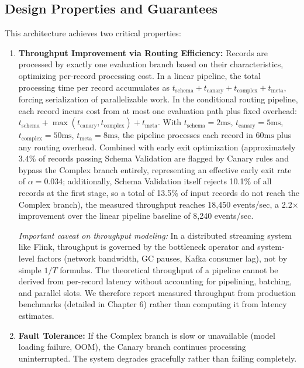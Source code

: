\subsection{Design Properties and Guarantees}

This architecture achieves two critical properties:

\begin{enumerate}
    \item \textbf{Throughput Improvement via Routing Efficiency:} Records are processed by exactly one evaluation branch based on their characteristics, optimizing per-record processing cost. In a linear pipeline, the total processing time per record accumulates as $t_{\text{schema}} + t_{\text{canary}} + t_{\text{complex}} + t_{\text{meta}}$, forcing serialization of parallelizable work. In the conditional routing pipeline, each record incurs cost from at most one evaluation path plus fixed overhead: $t_{\text{schema}} + \max(t_{\text{canary}}, t_{\text{complex}}) + t_{\text{meta}}$. With $t_{\text{schema}} = 2\text{ms}$, $t_{\text{canary}} = 5\text{ms}$, $t_{\text{complex}} = 50\text{ms}$, $t_{\text{meta}} = 8\text{ms}$, the pipeline processes each record in $60\text{ms}$ plus any routing overhead. Combined with early exit optimization (approximately 3.4\% of records passing Schema Validation are flagged by Canary rules and bypass the Complex branch entirely, representing an effective early exit rate of $\alpha = 0.034$; additionally, Schema Validation itself rejects 10.1\% of all records at the first stage, so a total of 13.5\% of input records do not reach the Complex branch), the measured throughput reaches 18,450 events/sec, a 2.2$\times$ improvement over the linear pipeline baseline of 8,240 events/sec.

        \textit{Important caveat on throughput modeling:} In a distributed streaming system like Flink, throughput is governed by the bottleneck operator and system-level factors (network bandwidth, GC pauses, Kafka consumer lag), not by simple $1/T$ formulas. The theoretical throughput of a pipeline cannot be derived from per-record latency without accounting for pipelining, batching, and parallel slots. We therefore report measured throughput from production benchmarks (detailed in Chapter 6) rather than computing it from latency estimates.

        \item \textbf{Fault Tolerance:} If the Complex branch is slow or unavailable (model loading failure, OOM), the Canary branch continues processing uninterrupted. The system degrades gracefully rather than failing completely.


\end{enumerate}
